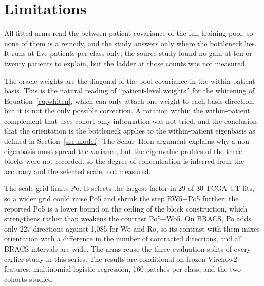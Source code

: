\section{Limitations}
\label{sec:limitations}
All fitted arms read the between-patient covariance of the full training pool, so none of them is a remedy, and the study answers only where the bottleneck lies. It runs at five patients per class only; the source study found no gain at ten or twenty patients to explain, but the ladder at those counts was not measured.

The oracle weights are the diagonal of the pool covariance in the within-patient basis. This is the natural reading of ``patient-level weights'' for the whitening of Equation~\ref{eq:whiten}, which can only attach one weight to each basis direction, but it is not the only possible correction. A rotation within the within-patient complement that uses cohort-only information was not tried, and the conclusion that the orientation is the bottleneck applies to the within-patient eigenbasis as defined in Section~\ref{sec:model}. The Schur--Horn argument explains why a non-eigenbasis must spread the variance, but the eigenvalue profiles of the three blocks were not recorded, so the degree of concentration is inferred from the accuracy and the selected scale, not measured.

The scale grid limits Po. It selects the largest factor in 29 of 30 TCGA-UT fits, so a wider grid could raise Po5 and shrink the step RW5$-$Po5 further; the reported Po5 is a lower bound on the ceiling of the block construction, which strengthens rather than weakens the contrast Po5$-$Wo5. On BRACS, Po adds only 227 directions against 1,085 for Wo and Ro, so its contrast with them mixes orientation with a difference in the number of contracted directions, and all BRACS intervals are wide. The arms reuse the three evaluation splits of every earlier study in this series. The results are conditional on frozen Virchow2 features, multinomial logistic regression, 160 patches per class, and the two cohorts studied.
